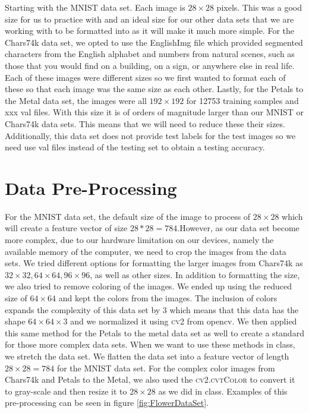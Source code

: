 \documentclass{article}
\begin{document}
\begin{multicols}{2}
Starting with the MNIST data set. Each image is $28 \times 28$ pixels. This was a good size for us to practice with and an ideal size for our other data sets that we are working with to be formatted into as it will make it much more simple. For the Chars74k data set, we opted to use the EnglishImg file which provided segmented characters from the English alphabet and numbers from natural scenes, such as those that you would find on a building, on a sign, or anywhere else in real life. Each of these images were different sizes so we first wanted to format each of these so that each image was the same size as each other. Lastly, for the Petals to the Metal data set, the images were all $192\times 192$ for 12753 training samples and xxx val files. With this size it is of orders of magnitude larger than our MNIST or Chars74k data sets. This means that we will need to reduce these their sizes. Additionally, this data set does not provide test labels for the test images so we need use val files instead of the testing set to obtain a testing accuracy.

\section*{Data Pre-Processing}

For the MNIST data set, the default size of the image to process of $28\times 28$ which will create a feature vector of size $28*28 = 784.$However, as our data set become more complex, due to our hardware limitation on our devices, namely the available memory of the computer, we need to crop the images from the data sets. We tried different options for formatting the larger images from Chars74k as $32\times 32, 64\times 64, 96\times 96$, as well as other sizes. In addition to formatting the size, we also tried to remove coloring of the images. We ended up using the reduced size of $64\times 64$ and kept the colors from the images. The inclusion of colors expands the complexity of this data set by $3$ which means that this data has the shape $64 \times 64\times 3$ and we normalized it using \textsc{cv2} from opencv. We then applied this same method for the Petals to the metal data set as well to create a standard for those more complex data sets. When we want to use these methods in class, we stretch the data set. We flatten the data set into a feature vector of length $28\times 28 = 784$ for the MNIST data set. For the complex color images from Chars74k and Petals to the Metal, we also used the \textsc{cv2.cvtColor} to convert it to gray-scale and then resize it to $28\times 28$ as we did in class. Examples of this pre-processing can be seen in figure \ref{fig:FlowerDataSet}.


\end{multicols}
\end{document}

